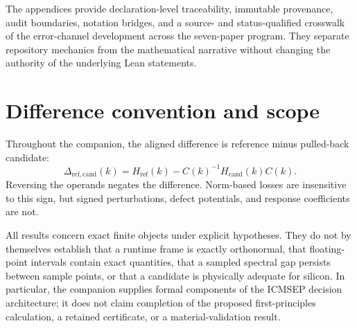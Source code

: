 The appendices provide declaration-level traceability, immutable provenance, audit
boundaries, notation bridges, and a source- and status-qualified crosswalk of the
error-channel development across the seven-paper program.  They separate repository
mechanics from the mathematical narrative without changing the authority of the
underlying Lean statements.

\section{Difference convention and scope}

Throughout the companion, the aligned difference is reference minus pulled-back
candidate:
\[
  \Delta_{\mathrm{ref},\mathrm{cand}}(k)
  =H_{\mathrm{ref}}(k)-C(k)^{-1}H_{\mathrm{cand}}(k)C(k).
\]
Reversing the operands negates the difference.  Norm-based losses are insensitive to
this sign, but signed perturbations, defect potentials, and response coefficients are
not.

All results concern exact finite objects under explicit hypotheses.  They do not by
themselves establish that a runtime frame is exactly orthonormal, that floating-point
intervals contain exact quantities, that a sampled spectral gap persists between sample
points, or that a candidate is physically adequate for silicon.  In particular, the
companion supplies formal components of the ICMSEP decision architecture; it does not
claim completion of the proposed first-principles calculation, a retained certificate,
or a material-validation result.
